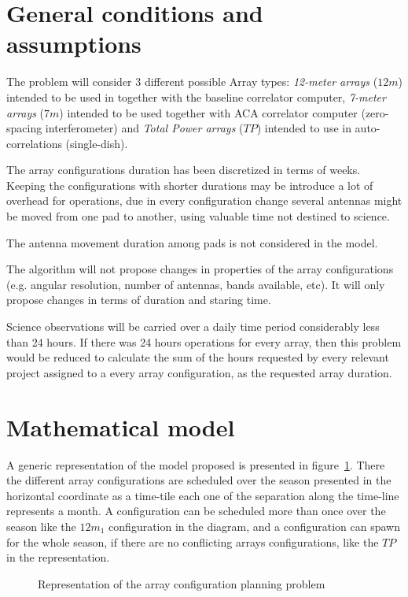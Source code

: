 \section{General conditions and assumptions}
\label{sec:array-problem-general-condition}
The problem will consider 3 different possible Array types: \textit{12-meter arrays} ($12m$) intended to be used in together with the baseline correlator computer, \textit{7-meter arrays} ($7m$) intended to be used together with ACA correlator computer (zero-spacing interferometer) and \textit{Total Power arrays} ($TP$) intended to use in auto-correlations (single-dish). 

The array configurations duration has been discretized in terms of weeks. Keeping the configurations with shorter durations may be introduce a lot of overhead for operations, due in every configuration change several antennas might be moved from one pad to another, using valuable time not destined to science.

The antenna movement duration among pads is not considered in the model.

The algorithm will not propose changes in properties of the array configurations (e.g. angular resolution, number of antennas, bands available, etc). It will only propose changes in terms of duration and staring time.

Science observations will be carried over a daily time period considerably less than 24 hours. If there was 24 hours operations for every array, then this problem would be reduced to calculate the sum of the hours requested by every relevant project assigned to a every array configuration, as the requested array duration.

\section{Mathematical model}

A generic representation of the model proposed is presented in figure~\ref{fig:array-planning-representation}. There the different array configurations are scheduled over the season presented in the horizontal coordinate as a time-tile each one of the separation along the time-line represents a month. A configuration can be scheduled more than once over the season like the $12m_1$ configuration in the diagram, and a configuration can spawn for the whole season, if there are no conflicting arrays configurations, like the $TP$ in the representation.

\begin{figure}
\def\svgwidth{\textwidth}

\caption{Representation of the array configuration planning problem}
\label{fig:array-planning-representation}
\end{figure}

